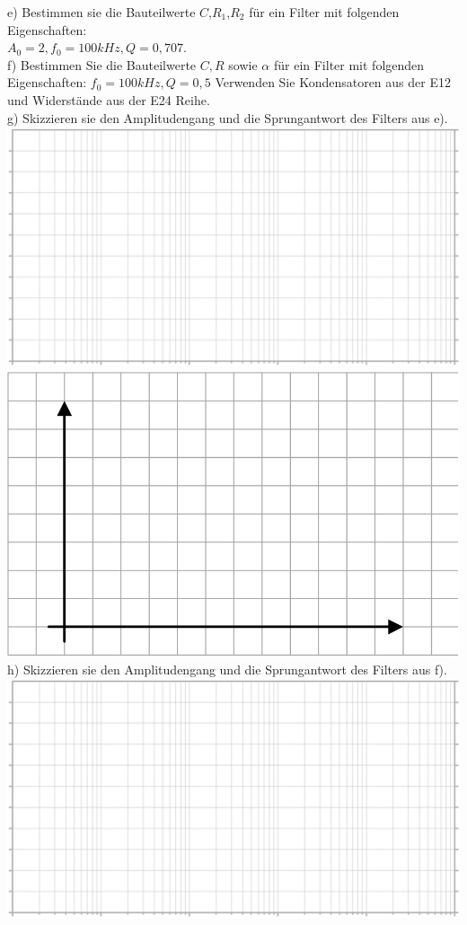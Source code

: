 \documentclass[A4]{scrartcl}
\begin{document}
  e) Bestimmen sie die Bauteilwerte $C$,$R_1$,$R_2$ für ein Filter mit folgenden Eigenschaften:\\
  $A_0 = 2,f_0 = 100kHz, Q=0,707$.\\
  f) Bestimmen Sie die Bauteilwerte $C,R$ sowie $\alpha$ für ein Filter mit folgenden Eigenschaften: 
  $f_0 = 100kHz, Q=0,5$
  Verwenden Sie Kondensatoren aus der E12 und Widerstände aus der E24 Reihe.\\
  g) Skizzieren sie den Amplitudengang und die Sprungantwort des Filters aus e).\\
  \includegraphics{logpaper.png}\\
  \includegraphics{normpaper.png}\\
  h) Skizzieren sie den Amplitudengang und die Sprungantwort des Filters aus f).\\
  \includegraphics{logpaper.png}\\
\end{document}
